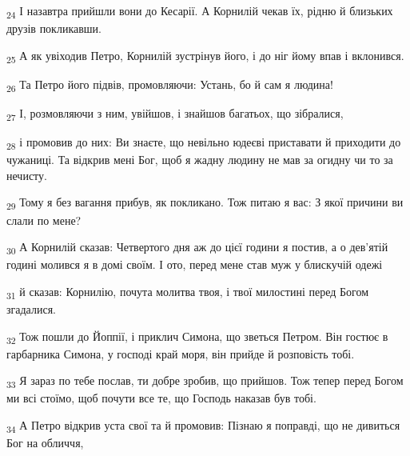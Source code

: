 \begin{tcolorbox}
\textsubscript{24} І назавтра прийшли вони до Кесарії. А Корнилій чекав їх, рідню й близьких друзів покликавши.
\end{tcolorbox}
\begin{tcolorbox}
\textsubscript{25} А як увіходив Петро, Корнилій зустрінув його, і до ніг йому впав і вклонився.
\end{tcolorbox}
\begin{tcolorbox}
\textsubscript{26} Та Петро його підвів, промовляючи: Устань, бо й сам я людина!
\end{tcolorbox}
\begin{tcolorbox}
\textsubscript{27} І, розмовляючи з ним, увійшов, і знайшов багатьох, що зібралися,
\end{tcolorbox}
\begin{tcolorbox}
\textsubscript{28} і промовив до них: Ви знаєте, що невільно юдеєві приставати й приходити до чужаниці. Та відкрив мені Бог, щоб я жадну людину не мав за огидну чи то за нечисту.
\end{tcolorbox}
\begin{tcolorbox}
\textsubscript{29} Тому я без вагання прибув, як покликано. Тож питаю я вас: З якої причини ви слали по мене?
\end{tcolorbox}
\begin{tcolorbox}
\textsubscript{30} А Корнилій сказав: Четвертого дня аж до цієї години я постив, а о дев'ятій годині молився я в домі своїм. І ото, перед мене став муж у блискучій одежі
\end{tcolorbox}
\begin{tcolorbox}
\textsubscript{31} й сказав: Корнилію, почута молитва твоя, і твої милостині перед Богом згадалися.
\end{tcolorbox}
\begin{tcolorbox}
\textsubscript{32} Тож пошли до Йоппії, і приклич Симона, що зветься Петром. Він гостює в гарбарника Симона, у господі край моря, він прийде й розповість тобі.
\end{tcolorbox}
\begin{tcolorbox}
\textsubscript{33} Я зараз по тебе послав, ти добре зробив, що прийшов. Тож тепер перед Богом ми всі стоїмо, щоб почути все те, що Господь наказав був тобі.
\end{tcolorbox}
\begin{tcolorbox}
\textsubscript{34} А Петро відкрив уста свої та й промовив: Пізнаю я поправді, що не дивиться Бог на обличчя,
\end{tcolorbox}
